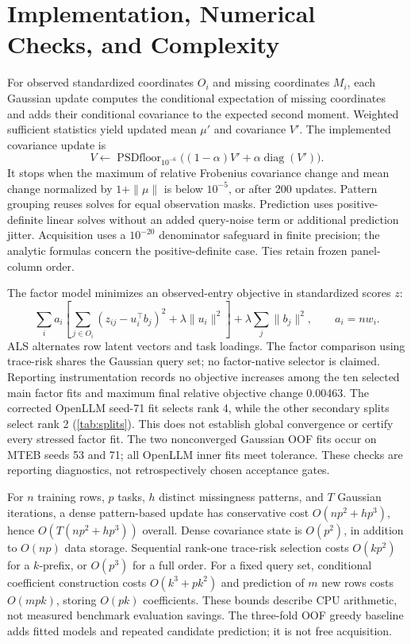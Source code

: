 \documentclass{article}
\begin{document}
\section{Implementation, Numerical Checks, and Complexity}
\label{app:implementation}
For observed standardized coordinates $O_i$ and missing coordinates $M_i$, each Gaussian update computes the conditional expectation of missing coordinates and adds their conditional covariance to the expected second moment. Weighted sufficient statistics yield updated mean $\mu'$ and covariance $V'$. The implemented covariance update is
\begin{equation}
 V\leftarrow\operatorname{PSDfloor}_{10^{-6}}
 \big((1-\alpha)V'+\alpha\operatorname{diag}(V')\big).
\end{equation}
It stops when the maximum of relative Frobenius covariance change and mean change normalized by $1+\|\mu\|$ is below $10^{-5}$, or after 200 updates. Pattern grouping reuses solves for equal observation masks. Prediction uses positive-definite linear solves without an added query-noise term or additional prediction jitter. Acquisition uses a $10^{-20}$ denominator safeguard in finite precision; the analytic formulas concern the positive-definite case. Ties retain frozen panel-column order.

The factor model minimizes an observed-entry objective in standardized scores $z$:
\begin{equation}
 \sum_i a_i\left[\sum_{j\in O_i}(z_{ij}-u_i^\top b_j)^2+\lambda\|u_i\|^2\right]
 +\lambda\sum_j\|b_j\|^2,\qquad a_i=nw_i.
\end{equation}
ALS alternates row latent vectors and task loadings. The factor comparison using trace-risk shares the Gaussian query set; no factor-native selector is claimed. Reporting instrumentation records no objective increases among the ten selected main factor fits and maximum final relative objective change 0.00463. The corrected OpenLLM seed-71 fit selects rank 4, while the other secondary splits select rank 2 (\cref{tab:splits}). This does not establish global convergence or certify every stressed factor fit. The two nonconverged Gaussian OOF fits occur on MTEB seeds 53 and 71; all OpenLLM inner fits meet tolerance. These checks are reporting diagnostics, not retrospectively chosen acceptance gates.

For $n$ training rows, $p$ tasks, $h$ distinct missingness patterns, and $T$ Gaussian iterations, a dense pattern-based update has conservative cost $O(np^2+hp^3)$, hence $O(T(np^2+hp^3))$ overall. Dense covariance state is $O(p^2)$, in addition to $O(np)$ data storage. Sequential rank-one trace-risk selection costs $O(kp^2)$ for a $k$-prefix, or $O(p^3)$ for a full order. For a fixed query set, conditional coefficient construction costs $O(k^3+pk^2)$ and prediction of $m$ new rows costs $O(mpk)$, storing $O(pk)$ coefficients. These bounds describe CPU arithmetic, not measured benchmark evaluation savings. The three-fold OOF greedy baseline adds fitted models and repeated candidate prediction; it is not free acquisition.
\end{document}
